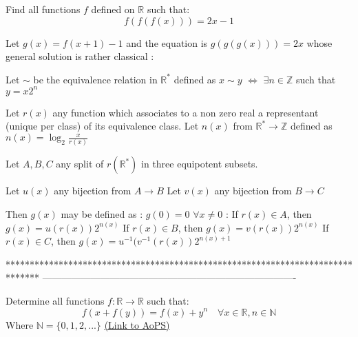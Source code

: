 \begin{solution}
	\begin{tcolorbox}Find all functions $f$ defined on $\mathbb R$ such that:
\[f(f(f(x))) = 2x-1\]\end{tcolorbox}
Let $g(x)=f(x+1)-1$ and the equation is $g(g(g(x)))=2x$ whose general solution is rather classical :

Let $\sim$ be the equivalence relation in $\mathbb R^*$ defined as $x\sim y$ $\iff$ $\exists n\in\mathbb Z$ such that $y=x2^n$

Let $r(x)$ any function which associates to a non zero real a representant (unique per class) of its equivalence class.
Let $n(x)$ from $\mathbb R^*\to\mathbb Z$ defined as $n(x)=\log_2\frac x{r(x)}$

Let $A,B,C$ any split of $r(\mathbb R^*)$ in three equipotent subsets.

Let $u(x)$ any bijection from $A\to B$
Let $v(x)$ any bijection from $B\to C$

Then $g(x)$ may be defined as :
$g(0)=0$
$\forall x\ne 0$ :
If $r(x)\in A$, then $g(x)=u(r(x))2^{n(x)}$
If $r(x)\in B$, then $g(x)=v(r(x))2^{n(x)}$
If $r(x)\in C$, then $g(x)=u^{-1}(v^{-1}(r(x))2^{n(x)+1}$
\end{solution}
*******************************************************************************
-------------------------------------------------------------------------------

\begin{problem}
	Determine all  functions $f: \mathbb R\to\mathbb R$ such that:
\[f(x+f(y))=f(x)+y^{n} \quad \forall x\in\mathbb R , n\in\mathbb N\] 
Where $\mathbb N=\{0,1,2,...\}$
	\flushright \href{https://artofproblemsolving.com/community/c6h566547}{(Link to AoPS)}
\end{problem}



